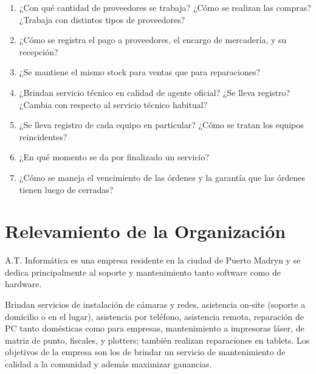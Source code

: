 \documentclass[12pt]{extarticle}
\begin{document}
\begin{spacing}{1.2}
\begin{enumerate}
        \item ¿Con qué cantidad de proveedores se trabaja? ¿Cómo se realizan las compras? ¿Trabaja con distintos tipos de proveedores?
        \item ¿Cómo se registra el pago a proveedores, el encargo de mercadería, y su recepción?
        \item ¿Se mantiene el mismo stock para ventas que para reparaciones?
        \item ¿Brindan servicio técnico en calidad de agente oficial? ¿Se lleva registro? ¿Cambia con respecto al servicio técnico habitual?
        \item ¿Se lleva registro de cada equipo en particular? ¿Cómo se tratan los equipos reincidentes?
        \item ¿En qué momento se da por finalizado un servicio?
        \item ¿Cómo se maneja el vencimiento de las órdenes y la garantía que las órdenes tienen luego de cerradas?
    \end{enumerate}

    \pagebreak









    \section{Relevamiento de la Organización}
    A.T. Informática es una empresa residente en la ciudad de Puerto Madryn y se dedica principalmente al soporte y mantenimiento tanto software como de hardware.

    Brindan servicios de instalación de cámaras y redes, asistencia on-site (soporte a domicilio o en el lugar), asistencia por teléfono, asistencia remota, reparación de PC tanto domésticas como para empresas, mantenimiento a impresoras láser, de matriz de punto, fiscales, y plotters; también realizan reparaciones en tablets.  Los objetivos de la empresa son los de brindar un servicio de mantenimiento de calidad a la comunidad y además maximizar ganancias.\\

    \pagebreak

\end{spacing}
\end{document}
